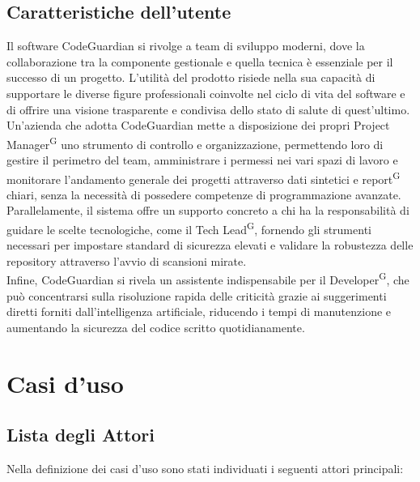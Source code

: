 \documentclass[a4paper, 11pt]{article}
\begin{document}
\subsection{Caratteristiche dell'utente}
Il software CodeGuardian si rivolge a team di sviluppo moderni, dove la collaborazione tra la componente gestionale e quella tecnica è essenziale per il successo di un progetto. L'utilità del prodotto risiede nella sua capacità di supportare le diverse figure professionali coinvolte nel ciclo di vita del software e di offrire una visione trasparente e condivisa dello stato di salute di quest'ultimo.
\\
Un'azienda che adotta CodeGuardian mette a disposizione dei propri Project Manager\textsuperscript{G} uno strumento di controllo e organizzazione, permettendo loro di gestire il perimetro del team, amministrare i permessi nei vari spazi di lavoro e monitorare l'andamento generale dei progetti attraverso dati sintetici e report\textsuperscript{G} chiari, senza la necessità di possedere competenze di programmazione avanzate.
\\
Parallelamente, il sistema offre un supporto concreto a chi ha la responsabilità di guidare le scelte tecnologiche, come il Tech Lead\textsuperscript{G}, fornendo gli strumenti necessari per impostare standard di sicurezza elevati e validare la robustezza delle repository attraverso l'avvio di scansioni mirate.
\\
Infine, CodeGuardian si rivela un assistente indispensabile per il Developer\textsuperscript{G}, che può concentrarsi sulla risoluzione rapida delle criticità grazie ai suggerimenti diretti forniti dall'intelligenza artificiale, riducendo i tempi di manutenzione e aumentando la sicurezza del codice scritto quotidianamente.

\section{Casi d'uso} \label{sec:casi d'uso}
\subsection{Lista degli Attori}
Nella definizione dei casi d'uso sono stati individuati i seguenti attori principali:
\end{document}
